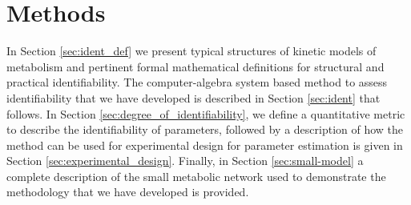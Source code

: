 \documentclass[10pt]{article}
\begin{document}
	\section{Methods}\label{sec:methods}
	In Section \ref{sec:ident_def} we present typical structures of kinetic models of metabolism and pertinent formal mathematical definitions for structural and practical identifiability. The computer-algebra system based method to assess identifiability that we have developed is described in Section \ref{sec:ident} that follows. In Section \ref{sec:degree_of_identifiability}, we define a quantitative metric to describe the identifiability of parameters, followed by a description of how the method can be used for experimental design for parameter estimation is given in Section \ref{sec:experimental_design}. Finally, in Section \ref{sec:small-model} a complete description of the small metabolic network used to demonstrate the methodology that we have developed is provided. %
	
	
\end{document}
